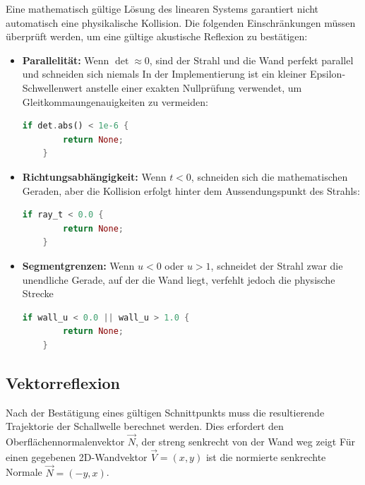 \documentclass{article}
\begin{document}
    Eine mathematisch gültige Lösung des linearen Systems garantiert nicht automatisch eine physikalische Kollision.
    Die folgenden Einschränkungen müssen überprüft werden, um eine gültige akustische Reflexion zu bestätigen:
    \begin{itemize}
        \item \textbf{Parallelität:} Wenn $\det \approx 0$, sind der Strahl und die Wand perfekt parallel und schneiden sich niemals
        In der Implementierung ist ein kleiner Epsilon-Schwellenwert anstelle einer exakten Nullprüfung verwendet, um Gleitkommaungenauigkeiten zu vermeiden:

        \begin{lstlisting}[language=Rust]
    if det.abs() < 1e-6 {
        return None;
    }
        \end{lstlisting}

        \item \textbf{Richtungsabhängigkeit:} Wenn $t < 0$, schneiden sich die mathematischen Geraden, aber die Kollision erfolgt hinter dem Aussendungspunkt des Strahls:
        \begin{lstlisting}[language=Rust]
    if ray_t < 0.0 {
        return None;
    }
        \end{lstlisting}
        \item \textbf{Segmentgrenzen:} Wenn $u < 0$ oder $u > 1$, schneidet der Strahl zwar die unendliche Gerade, auf der die Wand liegt, verfehlt jedoch die physische Strecke
        \begin{lstlisting}[language=Rust]
    if wall_u < 0.0 || wall_u > 1.0 {
        return None;
    }
        \end{lstlisting}
    \end{itemize}

    \subsection{Vektorreflexion}\label{subsec:reflection-vector-calculation}


    Nach der Bestätigung eines gültigen Schnittpunkts muss die resultierende Trajektorie der Schallwelle berechnet werden.
    Dies erfordert den Oberflächennormalenvektor $\vec{N}$, der streng senkrecht von der Wand weg zeigt
    Für einen gegebenen 2D-Wandvektor $\vec{V} = (x, y)$ ist die normierte senkrechte Normale $\vec{N} = (-y, x)$.
\end{document}
